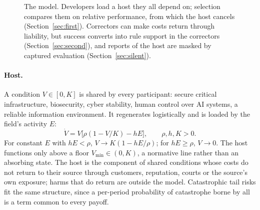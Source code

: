 \documentclass[letterpaper]{article} %
\theoremstyle{definition}
\newcommand{\dE}{\mathsf{E}}
\newcommand{\dS}{\mathsf{S}}
\newcommand{\Vmin}{V_{\min}}
\begin{document}
\begin{figure}[t]
\centering
{}
\caption{The model. Developers load a host they all depend on; selection compares them on relative performance, from which the host cancels (Section~\ref{sec:first}). Correctors can make costs return through liability, but success converts into rule support in the correctors (Section~\ref{sec:second}), and reports of the host are masked by captured evaluation (Section~\ref{sec:silent}).}
\label{fig:schematic}
\end{figure}

\paragraph{Host.} A condition $V\in[0,K]$ is shared by every participant: secure critical infrastructure, biosecurity, cyber stability, human control over AI systems, a reliable information environment. It regenerates logistically and is loaded by the field's activity $E$:
\begin{equation}\label{eq:V}
\dot V=V\big[\rho(1-V/K)-hE\big],\qquad \rho,h,K>0.
\end{equation}
For constant $E$ with $hE<\rho$, $V\to K(1-hE/\rho)$; for $hE\ge\rho$, $V\to0$. The host functions only above a floor $\Vmin\in(0,K)$, a normative line rather than an absorbing state. The host is the component of shared conditions whose costs do not return to their source through customers, reputation, courts or the source's own exposure; harms that do return are outside the model. Catastrophic tail risks fit the same structure, since a per-period probability of catastrophe borne by all is a term common to every payoff.
\end{document}
